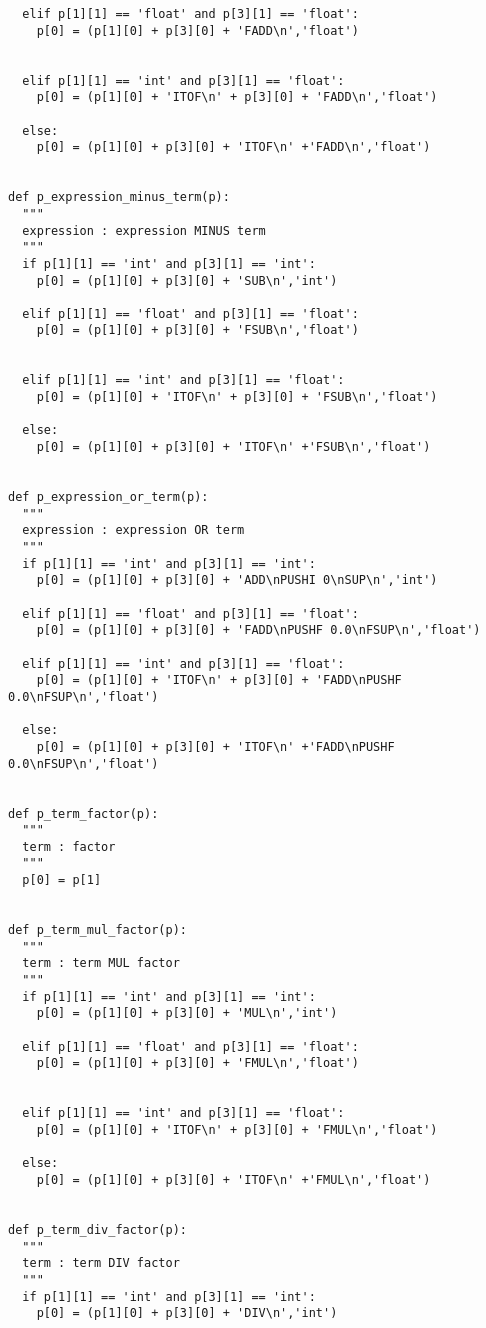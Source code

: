 \documentclass[11pt,a4paper]{report}%
\begin{document}
\begin{scriptsize}
\begin{verbatim}
  elif p[1][1] == 'float' and p[3][1] == 'float':
    p[0] = (p[1][0] + p[3][0] + 'FADD\n','float')

  
  elif p[1][1] == 'int' and p[3][1] == 'float':
    p[0] = (p[1][0] + 'ITOF\n' + p[3][0] + 'FADD\n','float')
  
  else:
    p[0] = (p[1][0] + p[3][0] + 'ITOF\n' +'FADD\n','float')


def p_expression_minus_term(p):
  """
  expression : expression MINUS term
  """
  if p[1][1] == 'int' and p[3][1] == 'int':
    p[0] = (p[1][0] + p[3][0] + 'SUB\n','int')
  
  elif p[1][1] == 'float' and p[3][1] == 'float':
    p[0] = (p[1][0] + p[3][0] + 'FSUB\n','float')

  
  elif p[1][1] == 'int' and p[3][1] == 'float':
    p[0] = (p[1][0] + 'ITOF\n' + p[3][0] + 'FSUB\n','float')
  
  else:
    p[0] = (p[1][0] + p[3][0] + 'ITOF\n' +'FSUB\n','float')


def p_expression_or_term(p):
  """
  expression : expression OR term
  """
  if p[1][1] == 'int' and p[3][1] == 'int':
    p[0] = (p[1][0] + p[3][0] + 'ADD\nPUSHI 0\nSUP\n','int')
  
  elif p[1][1] == 'float' and p[3][1] == 'float':
    p[0] = (p[1][0] + p[3][0] + 'FADD\nPUSHF 0.0\nFSUP\n','float')
  
  elif p[1][1] == 'int' and p[3][1] == 'float':
    p[0] = (p[1][0] + 'ITOF\n' + p[3][0] + 'FADD\nPUSHF 0.0\nFSUP\n','float')
  
  else:
    p[0] = (p[1][0] + p[3][0] + 'ITOF\n' +'FADD\nPUSHF 0.0\nFSUP\n','float')


def p_term_factor(p):
  """
  term : factor
  """
  p[0] = p[1]


def p_term_mul_factor(p):
  """
  term : term MUL factor
  """
  if p[1][1] == 'int' and p[3][1] == 'int':
    p[0] = (p[1][0] + p[3][0] + 'MUL\n','int')
  
  elif p[1][1] == 'float' and p[3][1] == 'float':
    p[0] = (p[1][0] + p[3][0] + 'FMUL\n','float')

  
  elif p[1][1] == 'int' and p[3][1] == 'float':
    p[0] = (p[1][0] + 'ITOF\n' + p[3][0] + 'FMUL\n','float')
  
  else:
    p[0] = (p[1][0] + p[3][0] + 'ITOF\n' +'FMUL\n','float')


def p_term_div_factor(p):
  """
  term : term DIV factor
  """
  if p[1][1] == 'int' and p[3][1] == 'int':
    p[0] = (p[1][0] + p[3][0] + 'DIV\n','int')
  

\end{verbatim}
\end{scriptsize}
\end{document}
